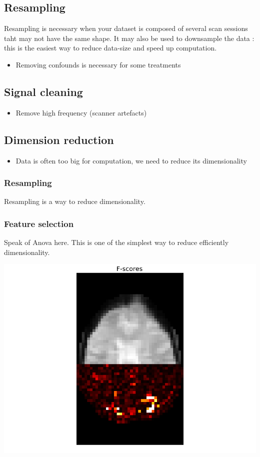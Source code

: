 \documentclass{frontiersSCNS} %
\begin{document}
\subsection{Resampling}

Resampling is necessary when your dataset is composed of several scan sessions
taht may not have the same shape. It may also be used to downsample the data :
this is the easiest way to reduce data-size and speed up computation.


\begin{itemize}
    \item Removing confounds is necessary for some treatments
\end{itemize}

\subsection{Signal cleaning}

\begin{itemize}
    \item Remove high frequency (scanner artefacts)
\end{itemize}


\subsection{Dimension reduction}

\begin{itemize}
    \item Data is often too big for computation, we need to reduce its
        dimensionality
\end{itemize}

\subsubsection{Resampling}

Resampling is a way to reduce dimensionality.

\subsubsection{Feature selection}

Speak of Anova here. This is one of the simplest way to reduce efficiently
dimensionality.

\includegraphics[width=.5\linewidth]{img/plot_haxby_searchlight_2.png}
\end{document}
